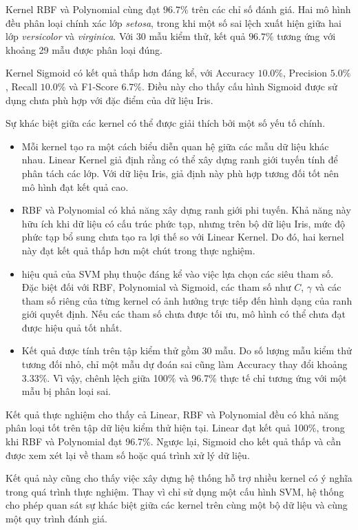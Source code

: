 \documentclass[12pt,a4paper]{report}
\begin{document}
	
	Kernel RBF và Polynomial cùng đạt $96.7\%$ trên các chỉ số đánh giá. Hai mô hình đều phân loại chính xác lớp \textit{setosa}, trong khi một số sai lệch xuất hiện giữa hai lớp \textit{versicolor} và \textit{virginica}. Với 30 mẫu kiểm thử, kết quả $96.7\%$ tương ứng với khoảng 29 mẫu được phân loại đúng.
	
	Kernel Sigmoid có kết quả thấp hơn đáng kể, với Accuracy $10.0\%$, Precision $5.0\%$, Recall $10.0\%$ và F1-Score $6.7\%$. Điều này cho thấy cấu hình Sigmoid được sử dụng chưa phù hợp với đặc điểm của dữ liệu Iris.
	
	Sự khác biệt giữa các kernel có thể được giải thích bởi một số yếu tố chính.
	
	\begin{itemize}
		\item Mỗi kernel tạo ra một cách biểu diễn quan hệ giữa các mẫu dữ liệu khác nhau. Linear Kernel giả định rằng có thể xây dựng ranh giới tuyến tính để phân tách các lớp. Với dữ liệu Iris, giả định này phù hợp tương đối tốt nên mô hình đạt kết quả cao.
		\item RBF và Polynomial có khả năng xây dựng ranh giới phi tuyến. Khả năng này hữu ích khi dữ liệu có cấu trúc phức tạp, nhưng trên bộ dữ liệu Iris, mức độ phức tạp bổ sung chưa tạo ra lợi thế so với Linear Kernel. Do đó, hai kernel này đạt kết quả thấp hơn một chút trong thực nghiệm.
		\item hiệu quả của SVM phụ thuộc đáng kể vào việc lựa chọn các siêu tham số. Đặc biệt đối với RBF, Polynomial và Sigmoid, các tham số như $C$, $\gamma$ và các tham số riêng của từng kernel có ảnh hưởng trực tiếp đến hình dạng của ranh giới quyết định. Nếu các tham số chưa được tối ưu, mô hình có thể chưa đạt được hiệu quả tốt nhất.
		\item  Kết quả được tính trên tập kiểm thử gồm 30 mẫu. Do số lượng mẫu kiểm thử tương đối nhỏ, chỉ một mẫu dự đoán sai cũng làm Accuracy thay đổi khoảng 3.33\%. 
		Vì vậy,  chênh lệch giữa 100\% và 96.7\% thực tế chỉ tương ứng với một mẫu bị phân loại sai.
		

	\end{itemize}

		Kết quả thực nghiệm cho thấy cả Linear, RBF và Polynomial đều có khả năng phân loại tốt trên tập dữ liệu kiểm thử hiện tại. Linear đạt kết quả 100\%, trong khi RBF và Polynomial đạt 96.7\%. Ngược lại, Sigmoid cho kết quả thấp và cần được xem xét lại về  tham số hoặc quá trình xử lý dữ liệu.
	
	Kết quả này cũng cho thấy việc xây dựng hệ thống hỗ trợ nhiều kernel có ý nghĩa trong quá trình thực nghiệm. Thay vì chỉ sử dụng một cấu hình SVM, hệ thống cho phép quan sát sự khác biệt giữa các kernel trên cùng một bộ dữ liệu và cùng một quy trình đánh giá.
	
\end{document}
